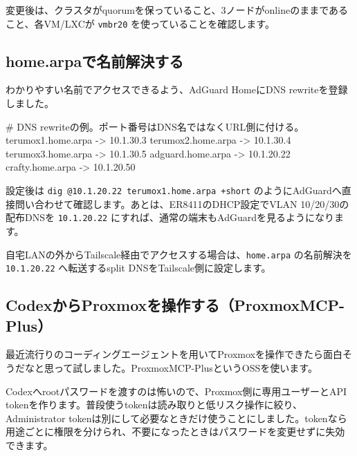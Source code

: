 変更後は、クラスタがquorumを保っていること、3ノードがonlineのままであること、各VM/LXCが \texttt{vmbr20} を使っていることを確認します。

\subsection{home.arpaで名前解決する}

わかりやすい名前でアクセスできるよう、AdGuard HomeにDNS rewriteを登録しました。

\begin{commands}
# DNS rewriteの例。ポート番号はDNS名ではなくURL側に付ける。
terumox1.home.arpa  -> 10.1.30.3
terumox2.home.arpa  -> 10.1.30.4
terumox3.home.arpa  -> 10.1.30.5
adguard.home.arpa   -> 10.1.20.22
crafty.home.arpa    -> 10.1.20.50
\end{commands}

設定後は \texttt{dig @10.1.20.22 terumox1.home.arpa +short} のようにAdGuardへ直接問い合わせて確認します。あとは、ER8411のDHCP設定でVLAN 10/20/30の配布DNSを \texttt{10.1.20.22} にすれば、通常の端末もAdGuardを見るようになります。

自宅LANの外からTailscale経由でアクセスする場合は、\texttt{home.arpa} の名前解決を \texttt{10.1.20.22} へ転送するsplit DNSをTailscale側に設定します。


\subsection{CodexからProxmoxを操作する（ProxmoxMCP-Plus）}

最近流行りのコーディングエージェントを用いてProxmoxを操作できたら面白そうだなと思って試しました。ProxmoxMCP-Plus\cite{proxmox-mcp-plus}というOSSを使います。

Codexへrootパスワードを渡すのは怖いので、Proxmox側に専用ユーザーとAPI tokenを作ります。普段使うtokenは読み取りと低リスク操作に絞り、Administrator tokenは別にして必要なときだけ使うことにしました。tokenなら用途ごとに権限を分けられ、不要になったときはパスワードを変更せずに失効できます。



